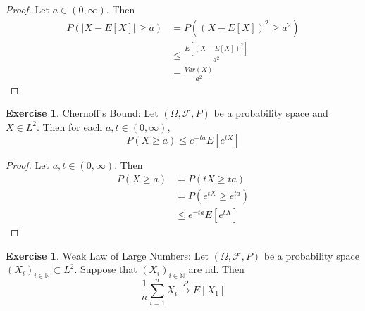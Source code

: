 \documentclass[12pt]{amsart}
\theoremstyle{definition}
\newtheorem{ex}[definition]{Exercise}
\newcommand{\Om}{\Omega}
\newcommand{\N}{\mathbb{N}}
\newcommand{\MF}{\mathcal{F}}
\newcommand{\conv}[1]{\xrightarrow{#1}}
\begin{document}
	\begin{proof}
		Let $a \in (0, \infty)$. Then 
		\begin{align*}
			P(\vert X - E[X] \vert \geq a) 
			&= P((X - E[X])^2 \geq a^2) \\
			&\leq \frac{E[(X - E[X])^2]}{a^2} \\
			&= \frac{Var(X)}{a^2}  
		\end{align*}
	\end{proof}
	
	\begin{ex}{Chernoff's Bound:}
		Let $(\Om, \MF, P)$ be a probability space and $X \in L^2$. Then for each $a, t \in (0, \infty)$, $$P( X \geq a) \leq e^{-ta}E[e^{tX}]$$
	\end{ex}
	
	\begin{proof}
		Let $a, t \in (0, \infty)$. Then 
		\begin{align*}
			P( X \geq a)
			&= P(tX \geq ta) \\
			&= P(e^{tX} \geq e^{ta}) \\
			& \leq e^{-ta}E[e^{tX}]
		\end{align*}
	\end{proof}
	
	\begin{ex}{Weak Law of Large Numbers:}
		Let $(\Om, \MF, P)$ be a probability space $(X_i)_{i\in \N} \subset L^2$. Suppose that $(X_i)_{i\in \N}$ are iid. Then $$\frac{1}{n}\sum_{i=1}^n X_i \conv{P} E[X_1]$$
	\end{ex}
	
\end{document}
